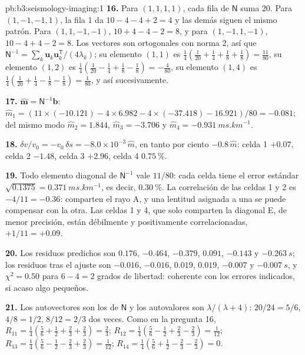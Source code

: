 \begin{solution}{pb:b3:seismology-imaging:1}
\textbf{16.} Para $(1,1,1,1)$, cada fila de $\mathsf N$ suma 20. Para
$(1,-1,-1,1)$, la fila 1 da $10 - 4 - 4 + 2 = 4$ y las demás siguen el mismo
patrón. Para $(1,1,-1,-1)$, $10 + 4 - 4 - 2 = 8$, y para $(1,-1,1,-1)$,
$10 - 4 + 4 - 2 = 8$. Los vectores son ortogonales con norma 2, así que
$\mathsf N^{-1} = \sum_k \mathbf u_k\mathbf u_k^{\mathsf T}/(4\lambda_k)$; su
elemento $(1,1)$ es $\tfrac14(\tfrac1{20} + \tfrac14 + \tfrac18 + \tfrac18) =
\tfrac{11}{80}$, su elemento $(1,2)$ es $\tfrac14(\tfrac1{20} - \tfrac14 + \tfrac18
- \tfrac18) = -\tfrac4{80}$, su elemento $(1,4)$ es $\tfrac14(\tfrac1{20} +
\tfrac14 - \tfrac18 - \tfrac18) = \tfrac1{80}$, y así sucesivamente.

\textbf{17.} $\hat{\mathbf m} = \mathsf N^{-1}\mathbf b$:
$\hat m_1 = (11\times(-10.121) - 4\times6.982 - 4\times(-37.418) - 16.921)/80
= -0.081$; del mismo modo $\hat m_2 = 1.844$, $\hat m_3 = -3.706$ y
$\hat m_4 = \qty{-0.931}{ms.km^{-1}}$.

\textbf{18.} $\delta v/v_0 = -v_0\,\delta s = -8.0\times10^{-3}\,\hat m$, en tanto por
ciento $-0.8\,\hat m$: celda 1 $+0.07$, celda 2 $-1.48$, celda 3 $+2.96$, celda
4 $\qty{+0.75}{\percent}$.

\textbf{19.} Todo elemento diagonal de $\mathsf N^{-1}$ vale $11/80$: cada celda
tiene el error estándar $\sqrt{0.1375} = \qty{0.371}{ms.km^{-1}}$, es decir,
$\qty{0.30}{\percent}$. La correlación de las celdas 1 y 2 es $-4/11 = -0.36$:
comparten el rayo A, y una lentitud asignada a una se puede compensar con la otra.
Las celdas 1 y 4, que solo comparten la diagonal E, de menor precisión, están
débilmente y positivamente correlacionadas, $+1/11 = +0.09$.

\textbf{20.} Los residuos predichos son $0.176$, $-0.464$, $-0.379$, $0.091$,
$-0.143$ y $\qty{-0.263}{s}$; los residuos tras el ajuste son $-0.016$,
$-0.016$, $0.019$, $0.019$, $-0.007$ y $\qty{-0.007}{s}$, y
$\chi^2 = 0.50$ para $6 - 4 = 2$ grados de libertad: coherente con los errores
indicados, si acaso algo pequeños.

\textbf{21.} Los autovectores son los de $\mathsf N$ y los autovalores son
$\lambda/(\lambda + 4)$: $20/24 = 5/6$, $4/8 = 1/2$, $8/12 = 2/3$ dos veces. Como
en la pregunta 16, $R_{11} = \tfrac14(\tfrac56 + \tfrac12 + \tfrac23 + \tfrac23) =
\tfrac23$; $R_{12} = \tfrac14(\tfrac56 - \tfrac12 + \tfrac23 - \tfrac23) =
\tfrac1{12}$; $R_{13} = \tfrac14(\tfrac56 - \tfrac12 - \tfrac23 + \tfrac23) =
\tfrac1{12}$; $R_{14} = \tfrac14(\tfrac56 + \tfrac12 - \tfrac23 - \tfrac23) = 0$.


\end{solution}
